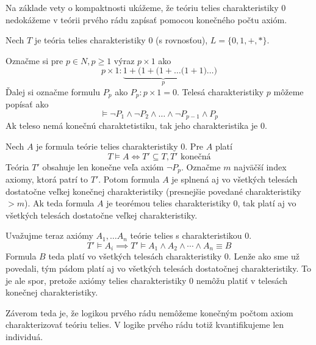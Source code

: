\begin{priklad}
    Na základe vety o kompaktnosti ukážeme, že teóriu telies
    charakteristiky 0 nedokážeme v teórii prvého rádu zapísať
    pomocou konečného počtu axióm.

    Nech $T$ je teória telies charakteristiky 0 (s rovnosťou),
    $L=\{0,1,+,*\}$.
    
    Označme si pre $p\in N, p\ge 1$ výraz $p \times 1$ ako
    \begin{equation*}
        p \times 1 : \underbrace{1 + (1 + ( 1 + \dots (1 + 1}_{p}) \dots )
    \end{equation*}
    Ďalej si označme formulu $P_p$ ako $P_p: p \times 1 = 0$.
    Telesá charakteristiky $p$ môžeme popísať ako
    \begin{equation*}
     \models \neg P_1 \land \neg P_2 \land \dots \land \neg P_{p-1}
        \land P_p
    \end{equation*}
    Ak teleso nemá konečnú charaktetistiku, tak jeho charakteristika
    je 0.

    Nech $A$ je formula teórie telies charakteristiky 0. Pre $A$ platí
    \begin{equation*}
     T \models A \iff T' \subseteq T, T'\mbox{ konečná}
    \end{equation*}
    Teória $T'$ obsahuje len konečne veľa axióm $\neg P_p$.
    Označme $m$ najväčší index axiomy, ktorá patrí to $T'$.
    Potom formula $A$ je splnená aj vo všetkých telesách dostatočne
    veľkej konečnej charakteristiky 
    (presnejšie povedané charakteristiky $>m$).
    Ak teda formula $A$ je teorémou telies charakteristiky $0$,
    tak platí aj vo všetkých telesách dostatočne veľkej charakteristiky.

    Uvažujme teraz axiómy $A_1, \dots A_n$ teórie telies s
    charakteristikou 0.
    \begin{equation*}
        T' \models A_i \implies T' \models A_1 \land A_2 \land \cdots
        \land A_n \equiv B
    \end{equation*}
    Formula $B$ teda platí vo všetkých telesách charakteristiky 0.
    Lenže ako sme už povedali, tým pádom platí aj vo všetkých telesách
    dostatočnej charakteristiky. To je ale spor, pretože axiómy telies
    charakteristiky 0 nemôžu platiť v telesách konečnej
    charakteristiky.

    Záverom teda je, že logikou prvého rádu nemôžeme 
    konečným počtom axiom charakterizovať teóriu telies.
    V logike prvého rádu totiž kvantifikujeme len individuá.
\end{priklad}

